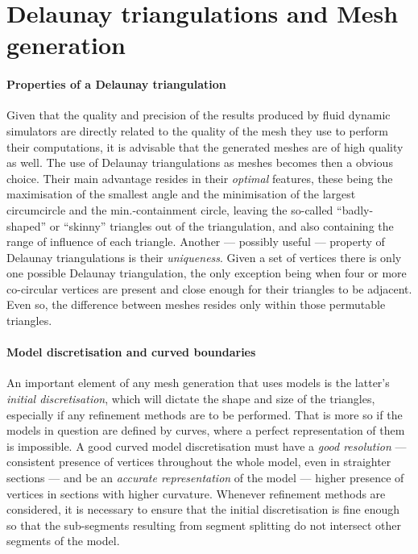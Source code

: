\section{Delaunay triangulations and Mesh generation}

\paragraph{Properties of a Delaunay triangulation} Given that the quality and precision of the results produced by fluid dynamic simulators are directly related to the quality of the mesh they use to perform their computations, it is advisable that the generated meshes are of high quality as well. The use of Delaunay triangulations as meshes becomes then a obvious choice. Their main advantage resides in their \textit{optimal} features, these being the maximisation of the smallest angle and the minimisation of the largest circumcircle and the min.-containment circle, leaving the so-called ``badly-shaped'' or ``skinny'' triangles out of the triangulation, and also containing the range of influence of each triangle. Another --- possibly useful --- property of Delaunay triangulations is their \textit{uniqueness}. Given a set of vertices there is only one possible Delaunay triangulation, the only exception being when four or more co-circular vertices are present and close enough for their triangles to be adjacent. Even so, the difference between meshes resides only within those permutable triangles.

\paragraph{Model discretisation and curved boundaries} An important element of any mesh generation that uses models is the latter's \textit{initial discretisation}, which will dictate the shape and size of the triangles, especially if any refinement methods are to be performed. That is more so if the models in question are defined by curves, where a perfect representation of them is impossible. A good curved model discretisation must have a \textit{good resolution} --- consistent presence of vertices throughout the whole model, even in straighter sections --- and be an \textit{accurate representation} of the model --- higher presence of vertices in sections with higher curvature. Whenever refinement methods are considered, it is necessary to ensure that the initial discretisation is fine enough so that the sub-segments resulting from segment splitting do not intersect other segments of the model.

